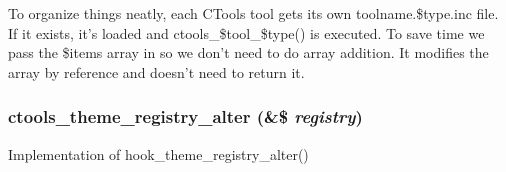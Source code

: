 To organize things neatly, each CTools tool gets its own toolname.\$type.inc file. If it exists, it's loaded and ctools\_\-\$tool\_\-\$type() is executed. To save time we pass the \$items array in so we don't need to do array addition. It modifies the array by reference and doesn't need to return it. \hypertarget{utility_8inc_a556bd4f6f591e705590138bc3d756291}{
\subsubsection[{ctools\_\-theme\_\-registry\_\-alter}]{\setlength{\rightskip}{0pt plus 5cm}ctools\_\-theme\_\-registry\_\-alter (\&\$ {\em registry})}}
\label{utility_8inc_a556bd4f6f591e705590138bc3d756291}
Implementation of hook\_\-theme\_\-registry\_\-alter() 